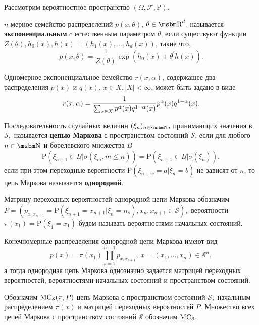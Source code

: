 Рассмотрим вероятностное пространство $(\Omega, \mathcal{F}, \mathrm{P}).$

\begin{opr}
$n\!$-мерное семейство распределений $p(x,\theta) \!$, $\theta \in \R^{d},$ называется \textbf{экспоненциальным} c естественным параметром $\theta \!$, если существуют функции $Z(\theta), h_0 (x), h(x) = (h_1 (x), \ldots, h_d(x)) \!$, такие что, 
$$p(x,\theta) = \frac{1}{Z(\theta)}\exp \left(  h_0(x) + \theta^\prime h(x) \right). $$  
\end{opr}

Одномерное экспоненциальное семейство $r(x, \alpha) \!$, содержащее два распределения $p(x)$ и $q(x)\!$, $x \in X, |X| < \infty \!$, может быть задано в виде $$r(x, \alpha) = \frac{1}{\sum_{x \in X} p^\al (x) q^\ea (x)} p^\al (x) q^\ea (x).$$ 

\begin{opr}
Последовательность случайных величин $(\xi_n)_{n \in \N},$ принимающих значения в $\mathcal{S},$ называется \textbf{цепью Маркова} с пространством состояний $\mathcal{S}$, если для любого $n \in \N$ и борелевского множества $B$ 
$$\mathrm{P} (\xi_{n + 1} \in B | \sigma(\xi_m, m \leq n)) = \mathrm{P} (\xi_{n + 1} \in B | \sigma(\xi_n)),$$
если при этом переходные вероятности $\mathrm{P}(\xi_{n+w} = a | \xi_{n} = b)$ не зависят от $n \!$, то цепь Маркова называется \textbf{однородной}.  
\end{opr}

Матрицу переходных вероятностей однородной цепи Маркова обозначим $P = (p_{x_n x_{n+1}} = \mathrm{P}(\xi_{n+1} = x_{n+1} | \xi_{n} = n_s), x_n, x_{n+1}  \in \mathcal{S}),$ вероятности $\pi(x_1) = \mathrm{P}(\xi_1 = x_1)$ будем называть вероятностями начальных состояний.

\begin{ass}
Конечномерные распределения однородной цепи Маркова имеют вид 
\begin{equation}
p(x) = \pi (x_1) \prod_{s=1}^{n-1} p_{x_s x_{s+1}}, \ x = (x_1, \ldots, x_n) \in \mathcal{S}^n,
\end{equation}
а тогда однородная цепь Маркова однозначно задается матрицей переходных вероятностей, вероятностями начальных состояний и пространством состояний.
\end{ass}

Обозначим $\mathrm{MC}_\mathcal{S}(\pi, P)$ цепь Маркова с пространством состояний $\mathcal{S}, $ начальным распределением $\pi(x)$ и матрицей переходных вероятностей $P.$ Множество всех цепей Маркова с пространством состояний $\mathcal{S}$ обозначим $\mathrm{MC}_\mathcal{S}.$

